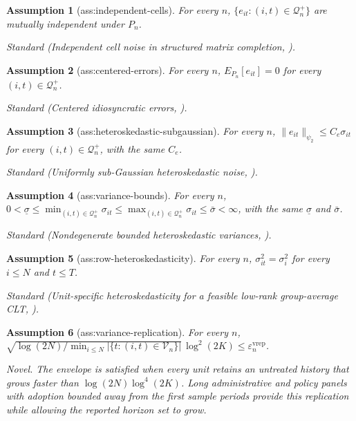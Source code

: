 \documentclass{article}
\newtheorem{assumption}{Assumption}
\begin{document}
\begin{assumption}[ass:independent-cells]\label{ass:independent-cells}
For every \(n\), \(\{e_{it}:(i,t)\in\mathcal Q_n^+\}\) are mutually independent under \(P_n\).
\par\smallskip\noindent\emph{Standard} (Independent cell noise in structured matrix completion, \cite{ChoiYuan2024MNAR}).
\end{assumption}

\begin{assumption}[ass:centered-errors]\label{ass:centered-errors}
For every \(n\), \(E_{P_n}[e_{it}]=0\) for every \((i,t)\in\mathcal Q_n^+\).
\par\smallskip\noindent\emph{Standard} (Centered idiosyncratic errors, \cite{ChoiYuan2024MNAR}).
\end{assumption}

\begin{assumption}[ass:heteroskedastic-subgaussian]\label{ass:heteroskedastic-subgaussian}
For every \(n\), \(\|e_{it}\|_{\psi_2}\le C_e\sigma_{it}\) for every \((i,t)\in\mathcal Q_n^+\), with the same \(C_e\).
\par\smallskip\noindent\emph{Standard} (Uniformly sub-Gaussian heteroskedastic noise, \cite{ChoiKwonLiao2024Completion}).
\end{assumption}

\begin{assumption}[ass:variance-bounds]\label{ass:variance-bounds}
For every \(n\), \(0<\underline\sigma\le\min_{(i,t)\in\mathcal Q_n^+}\sigma_{it}\le\max_{(i,t)\in\mathcal Q_n^+}\sigma_{it}\le\bar\sigma<\infty\), with the same \(\underline\sigma\) and \(\bar\sigma\).
\par\smallskip\noindent\emph{Standard} (Nondegenerate bounded heteroskedastic variances, \cite{ChoiKwonLiao2024Completion}).
\end{assumption}

\begin{assumption}[ass:row-heteroskedasticity]\label{ass:row-heteroskedasticity}
For every \(n\), \(\sigma_{it}^2=\sigma_i^2\) for every \(i\le N\) and \(t\le T\).
\par\smallskip\noindent\emph{Standard} (Unit-specific heteroskedasticity for a feasible low-rank group-average CLT, \cite{ChoiKwonLiao2024Completion}).
\end{assumption}

\begin{assumption}[ass:variance-replication]\label{ass:variance-replication}
For every \(n\), \(\sqrt{\log(2N)/\min_{i\le N}|\{t:(i,t)\in\mathcal V_n\}|}\,\log^2(2K)\le\varepsilon_n^{\mathrm{vrep}}\).
\par\smallskip\noindent\emph{Novel.} The envelope is satisfied when every unit retains an untreated history that grows faster than \(\log(2N)\log^4(2K)\). Long administrative and policy panels with adoption bounded away from the first sample periods provide this replication while allowing the reported horizon set to grow.
\end{assumption}
\end{document}

